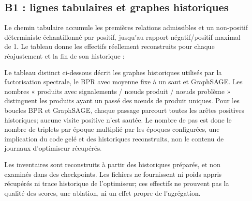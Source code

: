 \subsection{B1 : lignes tabulaires et graphes historiques}
Le chemin tabulaire accumule les premières relations admissibles et un non-positif déterministe échantillonné par positif, jusqu'au rapport négatif/positif maximal de 1. Le tableau donne les effectifs réellement reconstruits pour chaque réajustement et la fin de son historique :

\begin{table}[!htbp]\centering\small
\caption{B1, lignes tabulaires d'entraînement MAUDE aux trois réajustements; effectifs issus de .}
\label{tab:maude-B1-tabular}

\end{table}

Le tableau distinct ci-dessous décrit les graphes historiques utilisés par la factorisation spectrale, le BPR avec moyenne fixe à un saut et GraphSAGE. Les nombres « produits avec signalements / nœuds produit / nœuds problème » distinguent les produits ayant un passé des nœuds de produit uniques. Pour les boucles BPR et GraphSAGE, chaque passage parcourt toutes les arêtes positives historiques; aucune visite positive n'est sautée. Le nombre de pas est donc le nombre de triplets par époque multiplié par les époques configurées, une implication du code gelé et des historiques reconstruits, non le contenu de journaux d'optimiseur récupérés.

\begin{table}[!htbp]\centering\scriptsize\setlength{\tabcolsep}{2pt}
\caption{B1, inventaires des graphes et pas de gradient triplet impliqués par les boucles; effectifs reconstruits depuis . « -- » : non applicable à la factorisation spectrale.}
\label{tab:maude-B1-graph}

\end{table}

\FloatBarrier
Les inventaires sont reconstruits à partir des historiques préparés, et non examinés dans des checkpoints. Les fichiers ne fournissent ni poids appris récupérés ni trace historique de l'optimiseur; ces effectifs ne prouvent pas la qualité des scores, une ablation, ni un effet propre de l'agrégation.

\par{}
